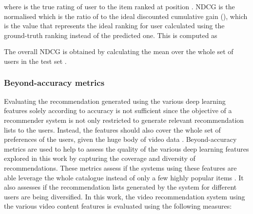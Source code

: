 \documentclass[review]{elsarticle}
\begin{document}
\begin{enumerate}
    
    
    
    where  is the true rating of user  to the item ranked at position . \ac{NDCG} is the normalised  which is the ratio of  to the ideal discounted cumulative gain (), which is the value that represents the ideal ranking for user  calculated using the ground-truth ranking instead of the predicted one. This is computed as \citep{deldjoo2019movie}
    
    
    
    The overall \ac{NDCG} is obtained by calculating the mean over the whole set of users in the test set \citep{deldjoo2019movie}.\\
\end{enumerate}



\subsubsection{Beyond-accuracy metrics}
Evaluating the recommendation generated using the various deep learning features solely according to accuracy is not sufficient since the objective of a recommender system is not only restricted to generate relevant recommendation lists to the users. Instead, the features should also cover the whole set of preferences of the users, given the huge body of video data \citep{silveira2019good}. Beyond-accuracy metrics are used to help to assess the quality of the various deep learning features explored in this work by capturing the coverage and diversity of recommendations. These metrics assess if the systems using these features are able leverage the whole catalogue instead of only a few highly popular items \citep{deldjoo2019movie}. It also assesses if the recommendation lists generated by the system for different users are being diversified. In this work, the video recommendation system using the various video content features is evaluated using the following measures:\\ 
\end{document}
